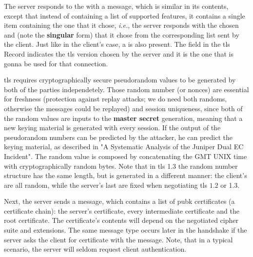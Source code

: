 \documentclass{llncs}
\begin{document}
The server responds to the  with a 
message, which is similar in its contents, except that instead of containing
a list of supported features, it contains a single item containing the one that it chose,
\textit{i.e.}, the server responds with the chosen  and
 (note the \textbf{singular} form) that it chose from the
corresponding list sent by the client. Just like in the client's case, a 
is also present. The  field in the \gls{tls} Record indicates
the \gls{tls} version chosen by the server and it is the one that is gonna be
used for that connection.

\gls{tls} requires cryptographically secure pseudorandom values to be generated
by both of the parties independetely. Those random number (or nonces) are essential for freshness
(protection against replay attacks; we do need both randoms, otherwise the messages could
be replayed) and session uniqueness, since both of
the random values are inputs to the \textbf{master secret} generation, meaning
that a new keying material is generated with every session. If the output of the pseudorandom numbers
can be predicted by the attacker, he can predict the keying material, as described
in "A Systematic Analysis of the Juniper Dual EC Incident"\cite{DualECJu15:online}.
The  random value is composed by concatenating the 
GMT UNIX time with  cryptographically random bytes. Note that in \gls{tls} 1.3
the random number structure has the same length, but is generated in a different manner:
the client's  are all random, while the server's last 
are fixed when negotiating \gls{tls} $1.2$ or 1.3.

Next, the server sends a  message, which contains a list
of \gls{pubk} certificates (a certificate chain): the server's certificate,
every intermediate certificate and the root certificate. The certificate's contents
will depend on the negotiated cipher suite and extensions.
The same message type occurs later in the handshake if the server asks the client for certificate with the
 message. Note, that in a typical scenario, the
server will seldom request client authentication.
\end{document}

